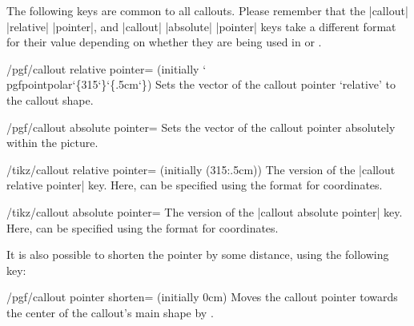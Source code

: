 The following keys are common to all callouts. Please remember that the
|callout| |relative| |pointer|, and |callout| |absolute| |pointer| keys take a
different format for their value depending on whether they are being used in
\pgfname{} or \tikzname{}.

\begin{key}{/pgf/callout relative pointer= (initially {\ttfamily\char`\\pgfpointpolar\char`\{315\char`\}\char`\{.5cm\char`\}})}
    Sets the vector of the callout pointer `relative' to the callout shape.
\end{key}

\begin{key}{/pgf/callout absolute pointer=}
    Sets the vector of the callout pointer absolutely within the picture.
\end{key}

\begin{key}{/tikz/callout relative pointer= (initially {(315:.5cm)})}
    The \tikzname{} version of the |callout relative pointer| key. Here,
     can be specified using the \tikzname{} format for
    coordinates.
\end{key}

\begin{key}{/tikz/callout absolute pointer=}
    The \tikzname{} version of the |callout absolute pointer| key. Here,
     can be specified using the \tikzname{} format for
    coordinates.
\end{key}

It is also possible to shorten the pointer by some distance, using the
following key:

\begin{key}{/pgf/callout pointer shorten= (initially 0cm)}
    Moves the callout pointer towards the center of the callout's main shape by
    .
\begin{codeexample}[preamble={\usetikzlibrary{shapes.callouts}}]
\end{codeexample}
\end{key}

